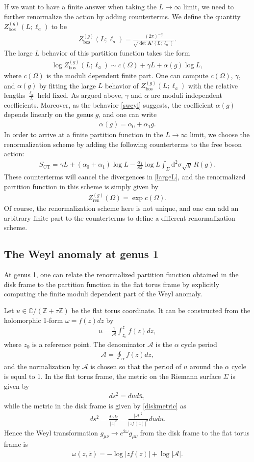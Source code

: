 \documentclass[12pt]{article}
\def\ie{\begin{equation}\begin{aligned}}
\def\fe{\end{aligned}\end{equation}}
\numberwithin{equation}{section}
\begin{document}
If we want to have a finite answer when taking the $L\rightarrow \infty$ limit, we need to further renormalize the action by adding counterterms. We define the quantity $Z^{(g)}_{\text{bos}}(L;\ell_a)$ to be
\ie
Z_{\text{bos}}^{(g)}(L;\ell_a) = \frac{(2\pi)^{-g}}{\sqrt{\det \mathbf{A}'(L;\ell_a)}}.
\fe
The large $L$ behavior of this partition function takes the form
\ie\label{largeL}
\log Z^{(g)}_{\text{bos}}(L;\ell_a) \sim c(\Omega) + \gamma L + \alpha(g) \log L,
\fe
where $c(\Omega)$ is the moduli dependent finite part. One can compute $c(\Omega)$, $\gamma$, and $\alpha(g)$ by fitting the large $L$ behavior of $Z^{(g)}_{\text{bos}}(L;\ell_a)$ with the relative lengths $\tfrac{\ell_a}{L}$ held fixed. As argued above, $\gamma$ and $\alpha$ are moduli independent coefficients. Moreover, as the behavior \eqref{sweyl} suggests, the coefficient $\alpha(g)$ depends linearly on the genus $g$, and one can write
\ie \alpha(g)=\alpha_0+\alpha_1 g.\fe
In order to arrive at a finite partition function in the $L\rightarrow \infty$ limit, we choose the renormalization scheme by adding the following counterterms to the free boson action:
\ie
S_\text{CT} = \gamma L + (\alpha_0+\alpha_1)\log L- \frac{\alpha_1}{8\pi}\log L\int_\Sigma \mathrm{d}^2\sigma \sqrt{g}\, R(g).
\fe
These counterterms will cancel the divergences in \eqref{largeL}, and the renormalized partition function in this scheme is simply given by
\ie \label{renZ}
Z_\text{ren}^{(g)}(\Omega) = \exp c(\Omega).
\fe
Of course, the renormalization scheme here is not unique, and one can add an arbitrary finite part to the counterterms to define a different renormalization scheme.

\subsection{The Weyl anomaly at genus 1}
\label{sec:WeylAnomalyGenus1}

At genus 1, one can relate the renormalized partition function obtained in the disk frame to the partition function in the flat torus frame by explicitly computing the finite moduli dependent part of the Weyl anomaly.

Let $u\in\mathbb{C}/(\mathbb{Z}+\tau\mathbb{Z})$ be the flat torus coordinate. It can be constructed from the holomorphic 1-form $\omega = f(z)dz$ by
\ie \label{ufromz}
u= \frac{1}{\mathcal{A}}\int^z_{z_0} f(z)dz,
\fe
where $z_0$ is a reference point. The denominator $\mathcal{A}$ is the $\alpha$ cycle period
\ie
\mathcal{A}=\oint_\alpha f(z)dz,
\fe
and the normalization by $\mathcal{A}$ is chosen so that the period of $u$ around the $\alpha$ cycle is equal to 1. In the flat torus frame, the metric on the Riemann surface $\Sigma$ is given by
\ie
ds^2 = du d\bar{u},
\fe
while the metric in the disk frame is given by \eqref{diskmetric} as
\ie
ds^2=\frac{dzd\bar{z}}{|z|^2} = \frac{|\mathcal{A}|^2}{|z f(z)|^2}dud\bar{u}.
\fe
Hence the Weyl transformation $g_{\mu\nu}\rightarrow e^{2\omega} g_{\mu\nu}$ from the disk frame to the flat torus frame is
\ie
\omega(z, \bar{z}) = -\log |z f(z)| + \log |\mathcal{A}|.
\fe
\end{document}
